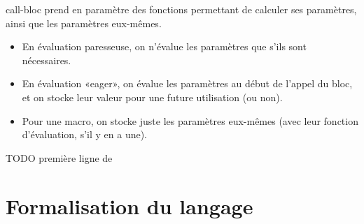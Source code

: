 \documentclass{article}
\begin{document}
{call-bloc prend en paramètre des fonctions permettant de calculer ses paramètres, ainsi que les paramètres eux-mêmes.
\begin{itemize}
\item En évaluation paresseuse, on n'évalue les paramètres que s'ils sont nécessaires.
\item En évaluation «eager», on évalue les paramètres au début de l'appel du bloc, et on stocke leur valeur pour une future utilisation (ou non).
\item Pour une macro, on stocke juste les paramètres eux-mêmes (avec leur fonction d'évaluation, s'il y en a une).
\end{itemize}

TODO première ligne de \section{Formalisation du langage}
}
\end{document}
